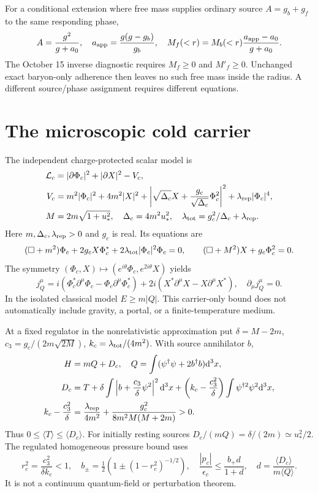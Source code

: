 \documentclass[11pt]{article}
\newcommand{\dd}{\mathrm d}
\newcommand{\Mb}{M_b}
\begin{document}
For a conditional extension where free mass supplies ordinary source
$A=g_b+g_f$ to the same responding phase,
\begin{equation}
 A=\frac{g^2}{g+a_0},\quad a_{\rm app}=\frac{g(g-g_b)}{g_b},\quad
 M_f(<r)=\Mb(<r)\frac{a_{\rm app}-a_0}{g+a_0}.
\end{equation}
The October 15 inverse diagnostic requires $M_f\ge0$ and $M'_f\ge0$.
Unchanged exact baryon-only adherence then leaves no such free mass inside
the radius. A different source/phase assignment requires different equations.

\section{The microscopic cold carrier}
The independent charge-protected scalar model is
\begin{align}
 \mathcal L_c&=|\partial\Phi_c|^2+|\partial X|^2-V_c,\\
 V_c&=m^2|\Phi_c|^2+4m^2|X|^2+
 \left|\sqrt{\Delta_c}X+\frac{g_c}{\sqrt{\Delta_c}}\Phi_c^2\right|^2
 +\lambda_{\rm rep}|\Phi_c|^4,\\
 M&=2m\sqrt{1+u_*^2},\quad \Delta_c=4m^2u_*^2,
 \quad\lambda_{\rm tot}=g_c^2/\Delta_c+\lambda_{\rm rep}.
\end{align}
Here $m,\Delta_c,\lambda_{\rm rep}>0$ and $g_c$ is real. Its equations are
\begin{equation}
 (\Box+m^2)\Phi_c+2g_c X\Phi_c^*
 +2\lambda_{\rm tot}|\Phi_c|^2\Phi_c=0,\qquad
 (\Box+M^2)X+g_c\Phi_c^2=0.
\end{equation}
The symmetry $(\Phi_c,X)\mapsto(e^{i\theta}\Phi_c,e^{2i\theta}X)$ yields
\begin{equation}
 j_Q^\mu=i(\Phi_c^*\partial^\mu\Phi_c-\Phi_c\partial^\mu\Phi_c^*)
 +2i(X^*\partial^\mu X-X\partial^\mu X^*),\quad \partial_\mu j_Q^\mu=0.
\end{equation}
In the isolated classical model $E\ge m|Q|$. This carrier-only bound does
not automatically include gravity, a portal, or a finite-temperature medium.

At a fixed regulator in the nonrelativistic approximation put
$\delta=M-2m$, $c_3=g_c/(2m\sqrt{2M})$, $k_c=\lambda_{\rm tot}/(4m^2)$.
With source annihilator $b$,
\begin{align}
 H&=mQ+D_c,\quad Q=\int(\psi^\dagger\psi+2b^\dagger b)\dd^3x,\\
 D_c&=T+\delta\int\left|b+\frac{c_3}{\delta}\psi^2\right|^2\dd^3x
 +\left(k_c-\frac{c_3^2}{\delta}\right)\int\psi^{\dagger2}\psi^2\dd^3x,\\
 k_c-\frac{c_3^2}{\delta}
 &=\frac{\lambda_{\rm rep}}{4m^2}
 +\frac{g_c^2}{8m^2M(M+2m)}>0.
\end{align}
Thus $0\le\langle T\rangle\le\langle D_c\rangle$. For initially resting
sources $D_c/(mQ)=\delta/(2m)\simeq u_*^2/2$.
The regulated homogeneous pressure bound uses
\begin{equation}
 r_c^2=\frac{c_3^2}{\delta k_c}<1,\quad
 b_\pm=\tfrac12(1\pm(1-r_c^2)^{-1/2}),\quad
 \frac{|p_c|}{\epsilon_c}\le\frac{b_+d}{1+d},\quad
 d=\frac{\langle D_c\rangle}{m\langle Q\rangle}.
\end{equation}
It is not a continuum quantum-field or perturbation theorem.
\end{document}
